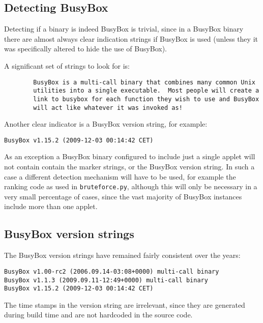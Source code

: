 \documentclass[10pt]{article}
\begin{document}
\subsection{Detecting BusyBox}

Detecting if a binary is indeed BusyBox is trivial, since in a BusyBox binary
there are almost always clear indication strings if BusyBox is used (unless
they it was specifically altered to hide the use of BusyBox).

A significant set of strings to look for is:

\begin{verbatim}
        BusyBox is a multi-call binary that combines many common Unix
        utilities into a single executable.  Most people will create a
        link to busybox for each function they wish to use and BusyBox
        will act like whatever it was invoked as!
\end{verbatim}

Another clear indicator is a BusyBox version string, for example:

\begin{verbatim}
BusyBox v1.15.2 (2009-12-03 00:14:42 CET)
\end{verbatim}

As an exception a BusyBox binary configured to include just a single applet
will not contain contain the marker strings, or the BusyBox version string. In
such a case a different detection mechanism will have to be used, for example
the ranking code as used in \texttt{bruteforce.py}, although this will only be
necessary in a very small percentage of cases, since the vast majority of
BusyBox instances include more than one applet.

\subsection{BusyBox version strings}

The BusyBox version strings have remained fairly consistent over the years:

\begin{verbatim}
BusyBox v1.00-rc2 (2006.09.14-03:08+0000) multi-call binary
BusyBox v1.1.3 (2009.09.11-12:49+0000) multi-call binary
BusyBox v1.15.2 (2009-12-03 00:14:42 CET)
\end{verbatim}

The time stamps in the version string are irrelevant, since they are generated
during build time and are not hardcoded in the source code.
\end{document}
